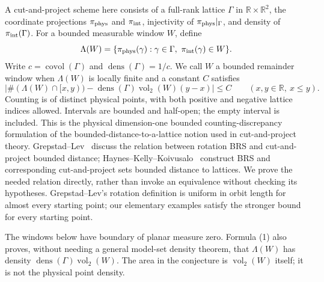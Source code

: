 \documentclass[11pt]{article}
\newcommand{\R}{\mathbb R}
\begin{document}
A cut-and-project scheme here consists of a full-rank lattice $\Gamma$
in $\R\times\R^2$, the coordinate projections $\pi_{\rm phys}$ and
$\pi_{\rm int}$, injectivity of $\pi_{\rm phys}|_\Gamma$, and density of
$\pi_{\rm int}(\Gamma)$. For a bounded measurable window $W$, define
\[
\Lambda(W)=\{\pi_{\rm phys}(\gamma):\gamma\in\Gamma,
                         \ \pi_{\rm int}(\gamma)\in W\}.
\]
Write $c=\operatorname{covol}(\Gamma)$ and
$\operatorname{dens}(\Gamma)=1/c$. We call $W$ a bounded remainder
window when $\Lambda(W)$ is locally finite and a constant $C$ satisfies
\[
\left|\#(\Lambda(W)\cap[x,y))-
        \operatorname{dens}(\Gamma)\operatorname{vol}_2(W)(y-x)\right|
\le C \qquad (x,y\in\R,\ x\le y).                 \tag{1}
\]
Counting is of distinct physical points, with both positive and negative
lattice indices allowed. Intervals are bounded and half-open; the empty
interval is included. This is the physical dimension-one bounded
counting-discrepancy formulation of the bounded-distance-to-a-lattice
notion used in cut-and-project theory. Grepstad--Lev~\cite{GL} discuss
the relation between rotation BRS and cut-and-project bounded distance;
Haynes--Kelly--Koivusalo~\cite{HKK} construct BRS and corresponding
cut-and-project sets bounded distance to lattices. We prove the needed
relation directly, rather than invoke an equivalence without checking
its hypotheses. Grepstad--Lev's rotation definition is uniform in orbit
length for almost every starting point; our elementary examples satisfy
the stronger bound for every starting point.

The windows below have boundary of planar measure zero. Formula (1)
also proves, without needing a general model-set density theorem, that
$\Lambda(W)$ has density $\operatorname{dens}(\Gamma)\operatorname{vol}_2(W)$.
The area in the conjecture is $\operatorname{vol}_2(W)$ itself; it is
not the physical point density.
\end{document}
